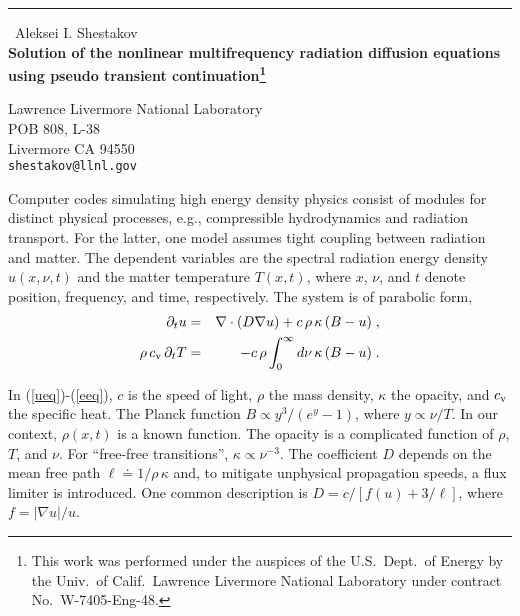 \documentclass{report}
\begin{document}
\begin{center}
\rule{6in}{1pt} \
{\large Aleksei I. Shestakov \\
{\bf Solution of the nonlinear multifrequency radiation diffusion equations using pseudo transient
continuation\footnote{This work
was performed under the auspices of the U.S.\ Dept.\ of Energy by the Univ.\ of Calif.\ Lawrence Livermore National Laboratory under contract No.\ W-7405-Eng-48.}}}

Lawrence Livermore National Laboratory \\ POB 808, L-38 \\ Livermore  CA  94550
\\
{\tt shestakov@llnl.gov}\end{center}

\newcommand{\be}{\begin{equation}}
\newcommand{\ee}{\end{equation}}
\newcommand{\bey}{\begin{eqnarray}}
\newcommand{\eey}{\end{eqnarray}}

\newcommand{\pref}[1]{(\ref{#1})}

\newcommand{\cv}{c_{\rm v}}
\newcommand{\dt}{\Delta t}
\newcommand{\gdt}{\Delta \tau}


Computer codes simulating high energy density physics
consist of modules for distinct physical processes, e.g.,
compressible hydrodynamics and radiation transport. For the
latter, one model assumes tight coupling between radiation
and matter. The dependent variables are the
spectral radiation energy density $u( x, \nu, t)$ and the matter
temperature $T( x, t)$, where $x$, $\nu$, and $t$ denote position,
frequency, and time, respectively.
The system is of parabolic form,
\bey
\partial_t u & = & \nabla \cdot (D \nabla u) +
c \, \rho \, \kappa \, ( B - u ) \; , \label{ueq} \\
\rho \, \cv \, \partial_t T & = & - c \, \rho \int_0^{\infty} d \nu
\, \kappa \, ( B - u ) \; . \label{eeq}
\eey

In \pref{ueq}-\pref{eeq}, $c$ is the speed of light, $\rho$ the
mass density, $\kappa$ the opacity, and $\cv$ the specific heat.
The Planck function
$B \propto y^3 / (e^y - 1)$, where $y \propto \nu / T$.
In our context, $\rho( x, t)$ is a known function. The opacity
is a complicated function of $\rho$, $T$, and $\nu$.
For ``free-free transitions'', $\kappa \propto \nu^{-3}$.
The coefficient $D$ depends on the mean free path
$\ell \doteq 1 / \rho \, \kappa$ and, to mitigate unphysical
propagation speeds, a flux limiter is introduced. One common
description is $D = c / [ f(u) + 3/ \ell]$, where $f= |\nabla u| / u$.
\end{document}
